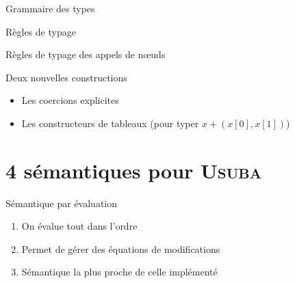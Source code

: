 \documentclass{beamer}
\newcommand{\Usuba}{\textsc{Usuba}}
\begin{document}
\begin{frame}{Grammaire des types}
\begin{figure}[t]
\end{figure}
\end{frame}

\begin{frame}{Règles de typage}
\begin{figure}
    \ottusedrule{\ottdruleBinop{}}
    \ottusedrule{\ottdruleTuple{}}
\end{figure}
\end{frame}

\begin{frame}{Règles de typage des appels de nœuds}
    \begin{figure}
        \ottusedrule{\ottdruleFun{}}
    \end{figure}
\end{frame}
    
\begin{frame}{Deux nouvelles constructions}
\begin{itemize}
\item<1-> Les coercions explicites
\item<2-> Les constructeurs de tableaux (pour typer $x + (x[0], x[1])$)
\end{itemize}
\end{frame}

\section{4 sémantiques pour \Usuba{}}

\begin{frame}{Sémantique par évaluation}
\begin{enumerate}
\item<1-> On évalue tout dans l'ordre
\item<2-> Permet de gérer des équations de modifications
\item<3-> Sémantique la plus proche de celle implémenté
\end{enumerate}
\end{frame}
\end{document}
